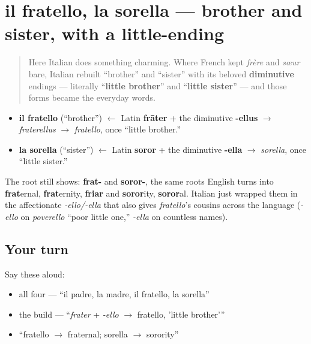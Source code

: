 \section[il fratello, la sorella]{il fratello, la sorella — brother and sister, with a little-ending}

\label{lesson:IT-C10-fratello-sorella}



\begin{quote}
Here Italian does something charming. Where French kept \emph{frère} and \emph{sœur} bare, Italian rebuilt \textquotedblleft{}brother\textquotedblright{} and \textquotedblleft{}sister\textquotedblright{} with its beloved \textbf{diminutive} endings — literally \textquotedblleft{}\textbf{little brother}\textquotedblright{} and \textquotedblleft{}\textbf{little sister}\textquotedblright{} — and those forms became the everyday words.
\end{quote}

\begin{cousinweb}
\begin{itemize}
\raggedright
  \item \textbf{il fratello} (\textquotedblleft{}brother\textquotedblright{}) $\leftarrow$ Latin \textbf{frāter} + the diminutive \textbf{-ellus} $\to$ \emph{fraterellus} $\to$ \emph{fratello}, once \textquotedblleft{}little brother.\textquotedblright{}
  \item \textbf{la sorella} (\textquotedblleft{}sister\textquotedblright{}) $\leftarrow$ Latin \textbf{soror} + the diminutive \textbf{-ella} $\to$ \emph{sorella}, once \textquotedblleft{}little sister.\textquotedblright{}
\end{itemize}

The root still shows: \textbf{frat-} and \textbf{soror-}, the same roots English turns into \textbf{frat}ernal, \textbf{frat}ernity, \textbf{friar} and \textbf{soror}ity, \textbf{soror}al. Italian just wrapped them in the affectionate \emph{-ello/-ella} that also gives \emph{fratello}'s cousins across the language (\emph{-ello} on \emph{poverello} \textquotedblleft{}poor little one,\textquotedblright{} \emph{-ella} on countless names).
\end{cousinweb}

\subsection*{Your turn}
Say these aloud:

\begin{itemize}
\raggedright
  \item all four — \textquotedblleft{}il padre, la madre, il fratello, la sorella\textquotedblright{}
  \item the build — \textquotedblleft{}\emph{frater} + \emph{-ello} $\to$ fratello, 'little brother'\textquotedblright{}
  \item \textquotedblleft{}fratello $\to$ fraternal; sorella $\to$ sorority\textquotedblright{}
\end{itemize}

